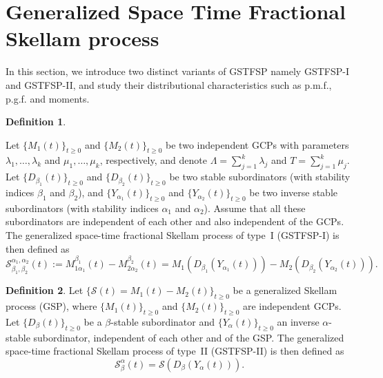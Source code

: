 \documentclass[11pt,oneside,reqno]{amsart}
\theoremstyle{definition}
\newtheorem{definition}{Definition}[section]
\theoremstyle{remarkstyle}
\begin{document}
\section{Generalized Space Time Fractional Skellam process}\label{sec 3}
In this section, we introduce two distinct variants of GSTFSP namely GSTFSP-I and GSTFSP-II, and study their distributional characteristics such as p.m.f., p.g.f. and moments.
\begin{definition}\label{definition_gstfsp1}

Let $\{M_{1}(t)\}_{t\ge 0}$ and 
$\{M_{2}(t)\}_{t\ge 0}$ be two independent 
GCPs with parameters $\lambda_{1},\ldots,\lambda_{k}$ and 
$\mu_{1},\ldots,\mu_{k}$, respectively, and denote 
$\Lambda=\sum_{j=1}^{k}\lambda_{j}$ and $T=\sum_{j=1}^{k}\mu_{j}$. 
Let $\{D_{\beta_1}(t)\}_{t\ge 0}$ and $\{D_{\beta_2}(t)\}_{t\ge 0}$ be 
two stable subordinators (with stability indices $\beta_1$ and $\beta_2$), and $\{Y_{\alpha_1}(t)\}_{t\ge 0}$ and 
$\{Y_{\alpha_2}(t)\}_{t\ge 0}$ be two inverse stable subordinators (with stability indices $\alpha_1$ and $\alpha_2$). 
Assume that all these subordinators are independent of each other 
and also independent of the GCPs. The 
generalized space-time fractional Skellam process of type~I 
(GSTFSP-I) is then defined as 
\begin{equation}\label{definition.GSTFSP-I}
    \mathcal{S}_{\beta_1,\beta_2}^{\alpha_1,\alpha_2}(t)
 := M_{1\alpha_1}^{\beta_1}(t)-M_{2\alpha_2}^{\beta_2}(t)=M_1(D_{\beta_1}(Y_{\alpha_1}(t))) 
 - M_2(D_{\beta_2}(Y_{\alpha_2}(t))).
\end{equation}
\end{definition}
\begin{definition}\label{definition_gstfsp2}
Let $\{\mathcal{S}(t)=M_1(t)-M_2(t)\}_{t\ge 0}$ be a generalized Skellam process (GSP), where $\{M_1(t)\}_{t\ge 0}$ and $\{M_2(t)\}_{t\ge 0}$ are independent GCPs. Let $\{D_{\beta}(t)\}_{t\ge 0}$ be a $\beta$-stable subordinator 
and $\{Y_{\alpha}(t)\}_{t\ge 0}$ an inverse $\alpha$-stable subordinator, 
independent of each other and of the GSP. The generalized 
space-time fractional Skellam process of type~II (GSTFSP-II) is 
then defined as
\begin{equation}\label{definition.GSTFSP-II}
    \mathcal{S}_{\beta}^{\alpha}(t)=\mathcal{S}(D_\beta(Y_\alpha(t))).
\end{equation}
\end{definition}
\end{document}
